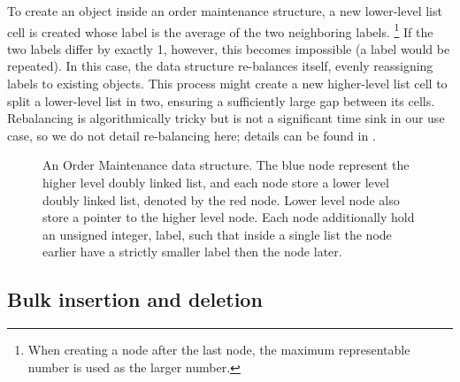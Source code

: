 To create an object inside an order maintenance structure,
  a new lower-level list cell is created
  whose label is the average of the two neighboring labels.%
\footnote{
  When creating a node after the last node,
  the maximum representable number is used as the larger number.
}
If the two labels differ by exactly 1, however,
  this becomes impossible (a label would be repeated).
In this case, the data structure re-balances itself,
  evenly reassigning labels to existing objects.
This process might
  create a new higher-level list cell
  to split a lower-level list in two,
  ensuring a sufficiently large gap between its cells.
Rebalancing is algorithmically tricky
  but is not a significant time sink in our use case,
  so we do not detail re-balancing here;
  details can be found in \citet{SOM}.

\begin{figure}
\caption{An Order Maintenance data structure. The blue node represent the higher level doubly linked list, and each node store a lower level doubly linked list, denoted by the red node. Lower level node also store a pointer to the higher level node. Each node additionally hold an unsigned integer, label, such that inside a single list the node earlier have a strictly smaller label then the node later.}
\label{fig:om}
\end{figure}

\subsection{Bulk insertion and deletion}

